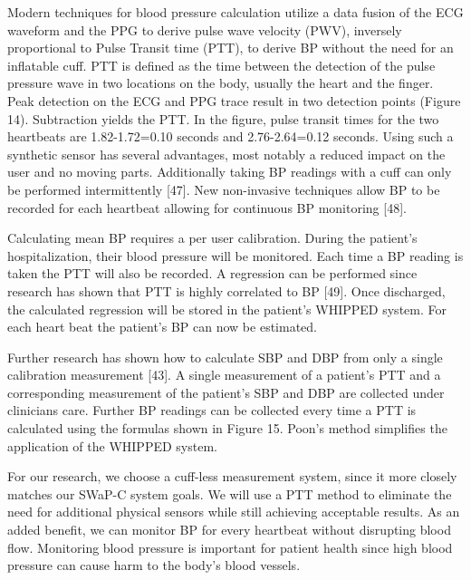 Modern techniques for blood pressure calculation utilize a data fusion of the ECG waveform and the PPG to derive pulse wave velocity (PWV), inversely proportional to Pulse Transit time (PTT), to derive BP without the need for an inflatable cuff.  PTT is defined as the time between the detection of the pulse pressure wave in two locations on the body, usually the heart and the finger. Peak detection on the ECG and PPG trace result in two detection points (Figure 14). Subtraction yields the PTT. In the figure, pulse transit times for the two heartbeats are 1.82-1.72=0.10 seconds and 2.76-2.64=0.12 seconds. Using such a synthetic sensor has several advantages, most notably a reduced impact on the user and no moving parts. Additionally taking BP readings with a cuff can only be performed intermittently [47]. New non-invasive techniques allow BP to be recorded for each heartbeat allowing for continuous BP monitoring [48]. 

Calculating mean BP requires a per user calibration. During the patient’s hospitalization, their blood pressure will be monitored. Each time a BP reading is taken the PTT will also be recorded. A regression can be performed since research has shown that PTT is highly correlated to BP [49]. Once discharged, the calculated regression will be stored in the patient’s WHIPPED system. For each heart beat the patient’s BP can now be estimated.  

Further research has shown how to calculate SBP and DBP from only a single calibration measurement [43]. A single measurement of a patient’s PTT and a corresponding measurement of the patient’s SBP and DBP are collected under clinicians care. Further BP readings can be collected every time a PTT is calculated using the formulas shown in Figure 15. Poon’s method simplifies the application of the WHIPPED system.

For our research, we choose a cuff-less measurement system, since it more closely matches our SWaP-C system goals. We will use a PTT method to eliminate the need for additional physical sensors while still achieving acceptable results. As an added benefit, we can monitor BP for every heartbeat without disrupting blood flow. Monitoring blood pressure is important for patient health since high blood pressure can cause harm to the body’s blood vessels.

